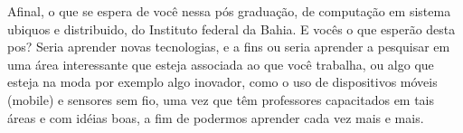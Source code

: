 Afinal, o que se espera de você nessa pós graduação, de computação em sistema ubiquos e distribuido, do Instituto federal da Bahia. E vocês o que esperão desta pos? Seria aprender novas tecnologias, e a fins ou seria aprender a pesquisar em uma área interessante que esteja associada ao que você trabalha, ou algo que esteja na moda por exemplo algo inovador, como o uso de dispositivos móveis (mobile) e sensores sem fio, uma vez que têm professores capacitados em tais áreas e com idéias boas, a fim de podermos aprender cada vez mais e mais.
